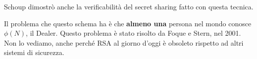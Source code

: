 \begin{note}
Schoup dimostrò anche la verificabilità del secret sharing fatto con questa tecnica.
\end{note}
\begin{note}
Il problema che questo schema ha è che \textbf{almeno una} persona nel mondo conosce $\phi(N)$, il Dealer. Questo problema è stato risolto da Foque e Stern, nel 2001. Non lo vediamo, anche perché RSA al giorno d'oggi è obsoleto rispetto ad altri sistemi di sicurezza.
\end{note}
